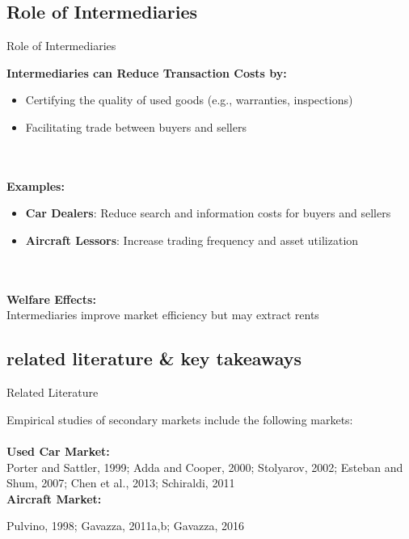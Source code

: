 \documentclass[aspectratio=169]{beamer}  %
\begin{document}
\subsection{Role of Intermediaries}

\begin{frame}{ Role of Intermediaries}{}
\begin{spacing}{1.25}
{\small
    \textbf{Intermediaries can Reduce Transaction Costs by:}
    \begin{itemize}
        \item Certifying the quality of used goods (e.g., warranties, inspections)
        \item Facilitating trade between buyers and sellers
    \end{itemize}\\
\quad\\
    \textbf{Examples:}
    \begin{itemize}
        \item \textbf{Car Dealers}: Reduce search and information costs for buyers and sellers
        \item \textbf{Aircraft Lessors}: Increase trading frequency and asset utilization
    \end{itemize}\\
\quad\\
    \textbf{Welfare Effects:} \\
    Intermediaries improve market efficiency but may extract rents 

    }
\end{spacing}
\end{frame}


\subsection{related literature \& key takeaways}

\begin{frame}{Related Literature }{}
\begin{spacing}{1.5}
{\small
Empirical studies of secondary markets include the following markets:\\
\quad\\
     \textbf{Used Car Market:}\\
        Porter and Sattler, 1999; Adda and Cooper, 2000; Stolyarov, 2002; Esteban and Shum, 2007; Chen et al., 2013; Schiraldi, 2011
\quad \\
        
    \textbf{Aircraft Market:}

        Pulvino, 1998; Gavazza, 2011a,b;  Gavazza, 2016

  

    }
\end{spacing}
\end{frame}
\end{document}

